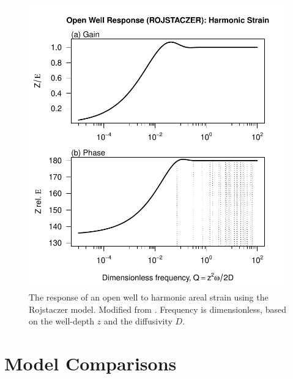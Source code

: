 \documentclass[12pt]{article}\usepackage[]{graphicx}\usepackage[]{color}
\makeatletter
\def\maxwidth{ %
  \ifdim\Gin@nat@width>\linewidth
    \linewidth
  \else
    \Gin@nat@width
  \fi
}
\newenvironment{knitrout}{}{} %
\makeatother
\begin{document}
\begin{figure}[htb!]
\begin{center}
\begin{knitrout}\small
{}\color{fgcolor}
\includegraphics[width=\maxwidth]{figure/ROJRESPFIG} 

\end{knitrout}

\caption{The response of an open well to harmonic areal strain using
the Rojstaczer model. Modified from \citet[][Fig.~3]{rojstaczer1988}.
Frequency is dimensionless, based on the well-depth $z$ and the diffusivity
$D$.}
\label{fig:owrsp-roj}
\end{center}
\end{figure}

\clearpage
\section{Model Comparisons}
\end{document}
